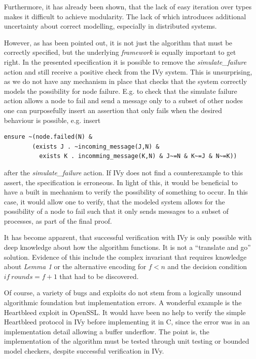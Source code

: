 \documentclass[fleqn]{article}
\begin{document}
Furthermore, it has already been shown, that the lack of easy iteration over types makes it difficult to achieve modularity. The lack of which introduces additional uncertainty about correct modelling, especially in distributed systems.


However, as has been pointed out, it is not just the algorithm that must be correctly specified, but the underlying \textit{framework} is equally important to get right. In the presented specification it is possible to remove the \textit{simulate\_failure} action and still receive a positive check from the IVy system. This is unsurprising, as we do not have any mechanism in place that checks that the system correctly models the possibility for node failure. E.g. to check that the simulate failure action allows a node to fail and send a message only to a subset of other nodes one can purposefully insert an assertion that only fails when the desired behaviour is possible, e.g. insert
\begin{mdframed}[backgroundcolor=light-gray, roundcorner=10pt,leftmargin=1, rightmargin=1, innerleftmargin=15, innertopmargin=15,innerbottommargin=15, outerlinewidth=1, linecolor=light-gray]
\begin{lstlisting}
ensure ~(node.failed(N) &
        (exists J . ~incoming_message(J,N) &
          exists K . incomming_message(K,N) & J~=N & K~=J & N~=K))
\end{lstlisting}
\end{mdframed}
after the \textit{simulate\_failure} action. If IVy does not find a counterexample to this assert, the specification is erroneous.  In light of this, it would be beneficial to have a built in mechanism to verify the possibility of something to occur. In this case, it would allow one to verify, that the modeled system allows for the possibility of a node to fail such that it only sends messages to a subset of processes, as part of the final proof.

It has become apparent, that successful verification with IVy is only possible with deep knowledge about how the algorithm functions. It is not a ``translate and go'' solution.
Evidence of this include the complex invariant that requires knowledge about \textit{Lemma 1} or the alternative encoding for $f<n$ and the decision condition $if\ rounds = f+1$ that had to be discovered.

Of course, a variety of bugs and exploits do not stem from a logically unsound algorithmic foundation but implementation errors. A wonderful example is the Heartbleed exploit in OpenSSL. It would have been no help to verify the simple Heartbleed protocol in IVy before implementing it in C, since the error was in an implementation detail allowing a buffer underflow. The point is, the implementation of the algorithm must be tested through unit testing or bounded model checkers, despite successful verification in IVy.
\end{document}
